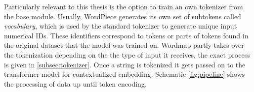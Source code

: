 Particularly relevant to this thesis is the option to train an own tokenizer from the base module.
Usually, WordPiece generates its own set of subtokens called \textit{vocabulary}, which is used by the standard tokenizer to generate unique input numerical IDs.
These identifiers correspond to tokens or parts of tokens found in the original dataset that the model was trained on.
Wordmap partly takes over the tokenization depending on the the type of input it receives, the exact process is given in \autoref{subsec:tokenizer}.
Once a string is tokenized it gets passed on to the transformer model for contextualized embedding.
Schematic \autoref{fig:pipeline} shows the processing of data up until token encoding.

\begin{figure}
    \centering



\end{figure}
